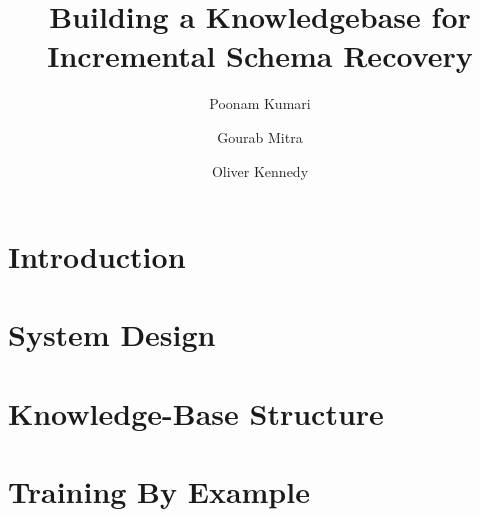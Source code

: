 \documentclass[sigconf]{acmart}
\begin{document}
\title{Building a Knowledgebase for Incremental Schema Recovery}


\author{Poonam Kumari}

\author{Gourab Mitra}

\author{Oliver Kennedy}


\renewcommand{\shortauthors}{Kumari et al.}


\begin{abstract}

\end{abstract}

%
%


\maketitle

\section{Introduction}
\label{sec:introduction}


\section{System Design}
\label{sec:system}


\section{Knowledge-Base Structure}
\label{sec:knowledgebase}


\section{Training By Example}
\label{sec:trainbyexample}

\end{document}
